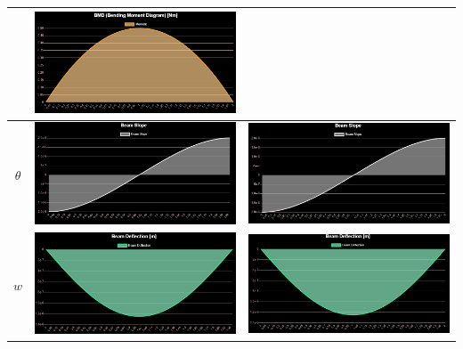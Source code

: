 \documentclass{jsarticle}
\begin{document}
\begin{table}[H]
\begin{center}
\begin{tabular}{|c|c|c|}
\begin{minipage}{6truecm}
\end{minipage}
&
\begin{minipage}{6truecm}
\centering
\includegraphics[width=6cm]{simple_distributed_model_FDM_bm.PNG}
\end{minipage}
\\
\hline
$\theta$ &
\begin{minipage}{6truecm}
\centering
\includegraphics[width=6cm]{simple_distributed_model_FEM_slo.PNG}
\end{minipage}
&
\begin{minipage}{6truecm}
\centering
\includegraphics[width=6cm]{simple_distributed_model_FDM_slo.PNG}
\end{minipage}
\\
\hline
$w$ &
\begin{minipage}{6truecm}
\centering
\includegraphics[width=6cm]{simple_distributed_model_FEM_def.PNG}
\end{minipage}
&
\begin{minipage}{6truecm}
\centering
\includegraphics[width=6cm]{simple_distributed_model_FDM_def.PNG}
\end{minipage}
\\
\hline
\end{tabular}
\end{center}
\end{table}
\end{document}
